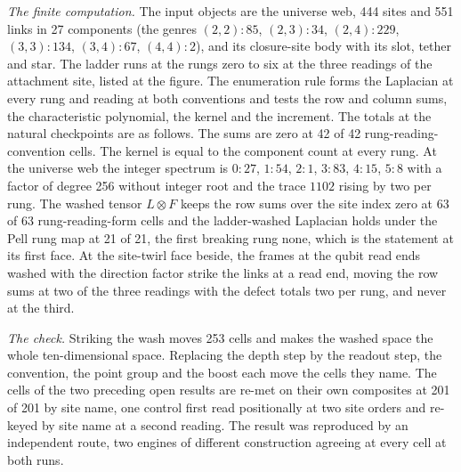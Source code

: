 \begin{chproof}
\textit{The finite computation.} The input objects are the universe web, 444 sites and 551 links in 27 components (the genres $(2,2){:}85$, $(2,3){:}34$, $(2,4){:}229$, $(3,3){:}134$, $(3,4){:}67$, $(4,4){:}2$), and its closure-site body with its slot, tether and star. The ladder runs at the rungs zero to six at the three readings of the attachment site, listed at the figure. The enumeration rule forms the Laplacian at every rung and reading at both conventions and tests the row and column sums, the characteristic polynomial, the kernel and the increment. The totals at the natural checkpoints are as follows. The sums are zero at 42 of 42 rung-reading-convention cells. The kernel is equal to the component count at every rung. At the universe web the integer spectrum is $0{:}27$, $1{:}54$, $2{:}1$, $3{:}83$, $4{:}15$, $5{:}8$ with a factor of degree 256 without integer root and the trace $1102$ rising by two per rung. The washed tensor $L\otimes F$ keeps the row sums over the site index zero at 63 of 63 rung-reading-form cells and the ladder-washed Laplacian holds under the Pell rung map at 21 of 21, the first breaking rung none, which is the statement at its first face. At the site-twirl face beside, the frames at the qubit read ends washed with the direction factor strike the links at a read end, moving the row sums at two of the three readings with the defect totals two per rung, and never at the third.

\textit{The check.} Striking the wash moves 253 cells and makes the washed space the whole ten-dimensional space. Replacing the depth step by the readout step, the convention, the point group and the boost each move the cells they name. The cells of the two preceding open results are re-met on their own composites at 201 of 201 by site name, one control first read positionally at two site orders and re-keyed by site name at a second reading. The result was reproduced by an independent route, two engines of different construction agreeing at every cell at both runs.
\end{chproof}

